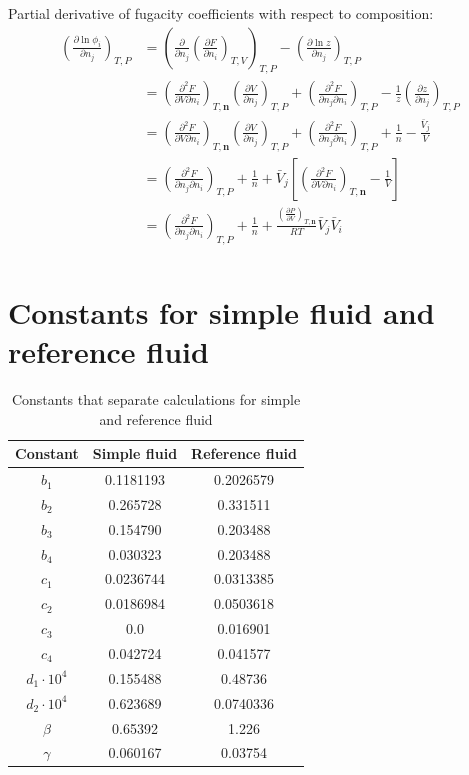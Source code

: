 \documentclass[internal,english]{sintefmemo2012}
\numberwithin{equation}{section}
\newcommand*{\pd}[2]{\frac{\partial #1}{\partial #2}}
\newcommand*{\pder}[2]{\left(\frac{\partial #1}{\partial #2}\right)}
\newcommand*{\pdcross}[3]{\left(\frac{\partial^2 #1}{\partial #2 \partial #3}\right)}
\begin{document}
Partial derivative of fugacity coefficients with respect to composition:
\begin{equation}
\begin{split}
\pder{\ln \phi_i}{n_j}_{T, P} 
& = \left(\pd{}{n_j} \pder{F}{n_i}_{T,V} \right)_{T, P} - \pder{\ln z}{n_j}_{T,P} \\
& = \pdcross{F}{V}{n_i}_{T,\textbf{n}} \pder{V}{n_j}_{T,P} + \pdcross{F}{n_j}{n_i}_{T,P} - \frac{1}{z} \pder{z}{n_j}_{T,P} \\
& = \pdcross{F}{V}{n_i}_{T,\textbf{n}} \pder{V}{n_j}_{T,P} + \pdcross{F}{n_j}{n_i}_{T,P} + \frac{1}{n} - \frac{\bar{V}_j}{V} \\
& = \pdcross{F}{n_j}{n_i}_{T,P} + \frac{1}{n} + \bar{V}_j \left[\pdcross{F}{V}{n_i}_{T,\textbf{n}} - \frac{1}{V} \right] \\
& = \pdcross{F}{n_j}{n_i}_{T,P} + \frac{1}{n} + \frac{\pder{P}{V}_{T,\textbf{n}}}{RT} \bar{V}_j \bar{V}_i \\
\end{split}
\end{equation}

\section{Constants for simple fluid and reference fluid}
\label{app:constants}
\begin{table}[h!]
\begin{center}
\caption{Constants that separate calculations for simple and reference fluid}
\label{tab:constants}
\begin{tabular}{c c c}
\hline
Constant & Simple fluid & Reference fluid \\
\hline
$b_1$	& 0.1181193	& 0.2026579 \\
$b_2$ 	& 0.265728	& 0.331511	\\
$b_3$	& 0.154790 	& 0.203488	\\
$b_4$	& 0.030323 	& 0.203488 	\\
$c_1$	& 0.0236744	& 0.0313385	\\
$c_2$	& 0.0186984 & 0.0503618	\\
$c_3$	& 0.0		& 0.016901	\\
$c_4$	& 0.042724	& 0.041577	\\
$d_1 \cdot 10^4$	& 0.155488  & 0.48736 	\\
$d_2 \cdot 10^4$	& 0.623689 	& 0.0740336\\
$\beta$	& 0.65392	& 1.226		\\
$\gamma$& 0.060167	& 0.03754	\\
\hline
\end{tabular}
\end{center}
\end{table}
\end{document}
